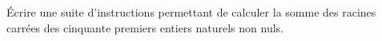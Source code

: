 \exer{}
\setcounter{numques}{0}

\'Ecrire une suite d'instructions permettant de calculer la somme des racines carrées des cinquante premiers entiers naturels non nuls. 

